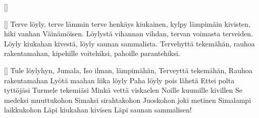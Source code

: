 
[]
\endsong


[]
  \chordsoff %
  \beginverse
    Terve löyly, terve lämmin
    terve henkäys kiukainen,
    kylpy lämpimäin kivisten,
    hiki vanhan Väinämöisen.
    Löylystä vihannan vihdan,
    tervan voimasta terveiden.
  \endverse
  \beginverse
    Löyly kiukahan kivestä,
    löyly saunan sammalista.
    Tervehyttä tekemähän,
    rauhoa rakentamahan,
    kipehille voitehiksi,
    pahoille parantehiksi.  
  \endverse 
\endsong


[]
  \chordsoff %
  \beginverse
    Tule löylyhyn, Jumala, 
    Iso ilman, lämpimähän,
  \endverse
  \beginverse
    Terveyttä tekemähän,
    Rauhoa rakentamahan
  \endverse
  \beginverse
    Lyötä maahan liika löyly
    Paha löyly pois lähetä
  \endverse
  \beginverse
    Ettei polta tyttöjäsi
    Turmele tekemiäsi
  \endverse
  \beginverse
    Minkä vettä viskaelen
    Noille kuumille kivillen
  \endverse
  \beginverse
    Se medeksi muuttukohon
    Simaksi sirahtakohon
  \endverse
  \beginverse
    Juoskohon joki metinen
    Simalampi laikkukohon
  \endverse
  \beginverse
    Läpi kiukahan kivisen
    Läpi saunan sammalisen! 
  \endverse 
\endsong


